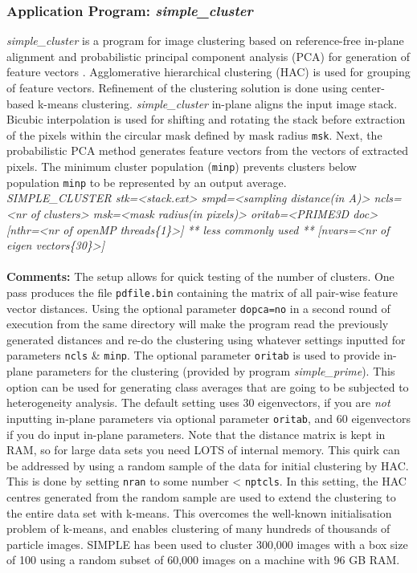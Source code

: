 \documentclass[review]{elsarticle}
\begin{document}
\subsubsection{Application Program: {\it{simple\_cluster}}}
\label{cluster}
{\it{simple\_cluster}} is a program for image clustering based on reference-free in-plane alignment \citep{Penczek:1992aa} and probabilistic principal component analysis (PCA) for generation of feature vectors \citep{Bishop:2006}. Agglomerative hierarchical clustering (HAC) is used for grouping of feature vectors. Refinement of the clustering solution is done using center-based k-means clustering. {\it{simple\_cluster}} in-plane aligns the input image stack. Bicubic interpolation is used for shifting and rotating the stack before extraction of the pixels within the circular mask defined by mask radius \texttt{msk}. Next, the probabilistic PCA method generates feature vectors from the vectors of extracted pixels. The minimum cluster population (\texttt{minp}) prevents clusters below population \texttt{minp} to be represented by an output average.\\
{\it{SIMPLE\_CLUSTER stk=<stack.ext> smpd=<sampling distance(in A)> ncls=<nr of}}
{\it{clusters> msk=<mask radius(in pixels)> oritab=<PRIME3D doc> [nthr=<nr of openMP}}
{\it{threads\{1\}>]}}
{\it{** less commonly used **}}
{\it{[nvars=<nr of eigen vectors\{30\}>]}}
\\\\
\noindent\textbf{Comments:} The setup allows for quick testing of the number of clusters. One pass produces the file \texttt{pdfile.bin} containing the matrix of all pair-wise feature vector distances. Using the optional parameter \texttt{dopca=no} in a second round of execution from the same directory will make the program read the previously generated distances and re-do the clustering using whatever settings inputted for parameters \texttt{ncls} \& \texttt{minp}. The optional parameter \texttt{oritab} is used to provide in-plane parameters for the clustering (provided by program {\it{simple\_prime}}). This option can be used for generating class averages that are going to be subjected to heterogeneity analysis. The default setting uses 30 eigenvectors, if you are \textit{not} inputting in-plane parameters via optional parameter \texttt{oritab}, and 60 eigenvectors if you do input in-plane parameters. Note that the distance matrix is kept in RAM, so for large data sets you need LOTS of internal memory. This quirk can be addressed by using a random sample of the data for initial clustering by HAC. This is done by setting \texttt{nran} to some number < \texttt{nptcls}. In this setting, the HAC centres generated from the random sample are used to extend the clustering to the entire data set with k-means. This overcomes the well-known initialisation problem of k-means, and enables clustering of many hundreds of thousands of particle images. SIMPLE has been used to cluster 300,000 images with a box size of 100 using a random subset of 60,000 images on a machine with 96 GB RAM.
\end{document}
